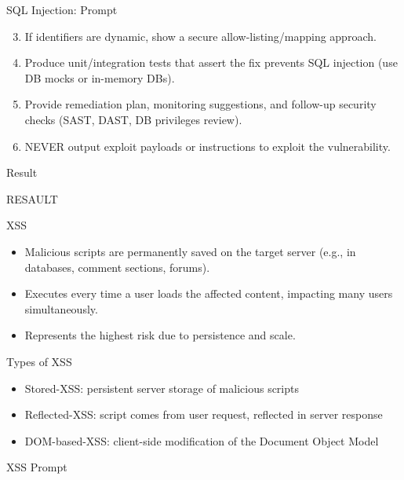 \documentclass[t,ignorenonframetext]{beamer}
\begin{document}
\begin{frame}{SQL Injection: Prompt}
\begin{tcolorbox}[colback=blue!5!white,colframe=navy!75!black,title=Tasks (Part 2)]
  \begin{enumerate}
    \setcounter{enumi}{2} %

    \item If identifiers are dynamic, show a secure allow-listing/mapping approach.
    \item Produce unit/integration tests that assert the fix prevents SQL injection (use DB mocks or in-memory DBs).
    \item Provide remediation plan, monitoring suggestions, and follow-up security checks (SAST, DAST, DB privileges review).
    \item NEVER output exploit payloads or instructions to exploit the vulnerability.
  \end{enumerate}
\end{tcolorbox}
\end{frame}

\begin{frame}{Result}
\begin{itemize}
RESAULT
\end{itemize}
\end{frame}

\begin{frame}{XSS}
\begin{itemize}
  \item Malicious scripts are permanently saved on the target server (e.g., in databases, comment sections, forums).
    \item Executes every time a user loads the affected content, impacting many users simultaneously.
    \item Represents the highest risk due to persistence and scale.

\end{itemize}
\end{frame}
\begin{frame}{Types of XSS}
\begin{itemize}
    \item Stored-XSS: persistent server storage of malicious scripts
    \item Reflected-XSS: script comes from user request, reflected in server response
    \item DOM-based-XSS: client-side modification of the Document Object Model
\end{itemize}
\end{frame}
\begin{frame}{XSS Prompt}
\begin{tcolorbox}
[colback=blue!5!white,colframe=navy!75!black,title=Persona]

\end{tcolorbox}
\end{frame}
\end{document}
